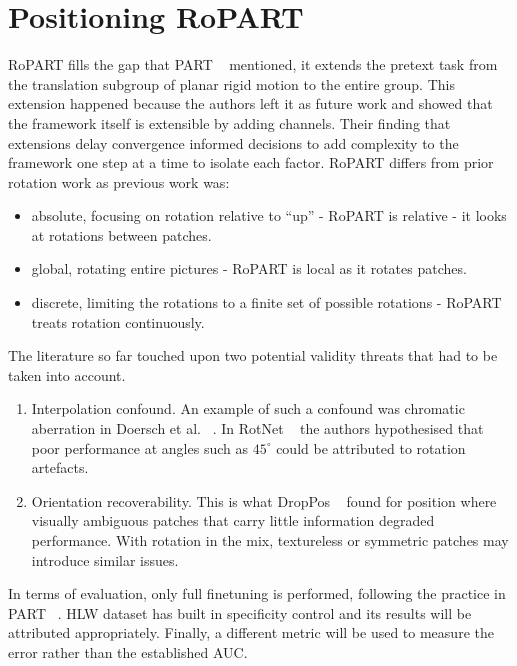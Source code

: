 \documentclass[final_report.tex]{subfiles}
\begin{document}
\section{Positioning RoPART}\label{sec:positioning}
RoPART fills the gap that PART ~\cite{part} mentioned, it extends the pretext task from the translation subgroup of planar rigid motion to the entire \SEtwo{} group. This extension happened because the authors left it as future work and showed that the framework itself is extensible by adding channels. Their finding that extensions delay convergence informed decisions to add complexity to the framework one step at a time to isolate each factor. RoPART differs from prior rotation work as previous work was: \begin{itemize}
\item absolute, focusing on rotation relative to ``up'' - RoPART is relative - it looks at rotations between patches.
\item global, rotating entire pictures - RoPART is local as it rotates patches.
\item discrete, limiting the rotations to a finite set of possible rotations - RoPART treats rotation continuously.
\end{itemize}
The literature so far touched upon two potential validity threats that had to be taken into account. \begin{enumerate}
\item Interpolation confound. An example of such a confound was chromatic aberration in Doersch et al. ~\cite{context2015}. In RotNet ~\cite{rotnet} the authors hypothesised that poor performance at angles such as $45^\circ$ could be attributed to rotation artefacts.
\item Orientation recoverability. This is what DropPos ~\cite{droppos} found for position where visually ambiguous patches that carry little information degraded performance. With rotation in the mix, textureless or symmetric patches may introduce similar issues.
\end{enumerate}
In terms of evaluation, only full finetuning is performed, following the practice in PART ~\cite{part}. HLW dataset has built in specificity control and its results will be attributed appropriately. Finally, a different metric will be used to measure the error rather than the established AUC.



\ifSubfilesClassLoaded{\pagebreak\printbibliography}{}
\end{document}
